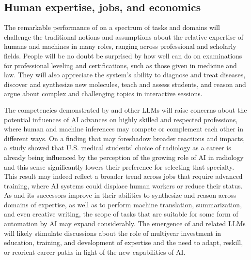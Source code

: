 
\subsection {Human expertise, jobs, and economics} 

The remarkable performance of {\DV} on a spectrum of tasks and domains will challenge the traditional notions and assumptions about the relative expertise of humans and machines in many roles, ranging across professional and scholarly fields. People will be no doubt be surprised by how well {\DV} can do on examinations for professional leveling and certifications, such as those given in medicine and law. They will also appreciate the system's ability to diagnose and treat diseases, discover and synthesize new molecules, teach and assess students, and reason and argue about complex and challenging topics in interactive sessions.

The competencies demonstrated by {\DV} and other LLMs will raise concerns about the potential influences of AI advances on highly skilled and respected professions, where human and machine inferences may compete or complement each other in different ways. On a finding that may foreshadow broader reactions and impacts, a study \cite{Reeder2022} showed that U.S. medical students' choice of radiology as a career is already being influenced by the perception of the growing role of AI in radiology and this sense significantly lowers their preference for selecting that specialty. This result may indeed reflect a broader trend across jobs that require advanced training, where AI systems could displace human workers or reduce their status. As {\DV} and its successors improve in their abilities to synthesize and reason across domains of expertise, as well as to perform machine translation, summarization, and even creative writing, the scope of tasks that are suitable for some form of automation by AI may expand considerably.  The emergence of {\DV} and related LLMs will likely stimulate discussions about the role of multiyear investment in education, training, and development of expertise and the need to adapt, reskill, or reorient career paths in light of the new capabilities of AI. 

